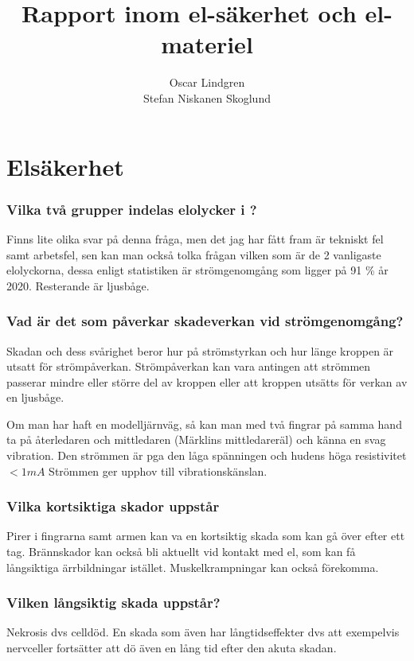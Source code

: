 \documentclass[a4paper,swedish]{article}
\title{Rapport inom el-säkerhet och el-materiel}
\author{Oscar Lindgren\\Stefan Niskanen Skoglund}
\begin{document}
\part{Elsäkerhet}

\section{Vilka två grupper indelas elolycker i ?}\label{sec:q_1}

Finns lite olika svar på denna fråga, men det jag har fått fram är tekniskt fel samt arbetsfel, sen kan man
också tolka frågan
vilken som är de 2 vanligaste elolyckorna, dessa enligt statistiken är strömgenomgång som ligger på 91 \%
år 2020. Resterande är ljusbåge.

\section{Vad är det som påverkar skadeverkan vid strömgenomgång?} \label{sec:strömgenomgång}

Skadan och dess svårighet beror hur på strömstyrkan och hur länge kroppen är utsatt för strömpåverkan.
Strömpåverkan kan vara antingen att strömmen passerar mindre eller större del av kroppen eller att kroppen
utsätts för verkan av en ljusbåge.

Om man har haft en modelljärnväg, så kan man med två fingrar på samma hand ta på återledaren och mittledaren (Märklins mittledareräl) och känna en svag
vibration. Den strömmen är pga den låga spänningen och hudens höga resistivitet $< 1 mA$
Strömmen ger upphov till vibrationskänslan.

\section{Vilka kortsiktiga skador uppstår}
\label{sec:q_3}

Pirer i fingrarna samt armen kan va en kortsiktig skada som kan gå över efter ett tag. Brännskador kan också bli aktuellt
vid kontakt med el, som kan få långsiktiga ärrbildningar istället. Muskelkrampningar kan också förekomma.

\section{Vilken långsiktig skada uppstår?}\label{sec:permanent_skada}

Nekrosis dvs celldöd. En skada som även har långtidseffekter dvs att exempelvis nervceller
fortsätter att dö även en lång tid efter den akuta skadan.
\end{document}

